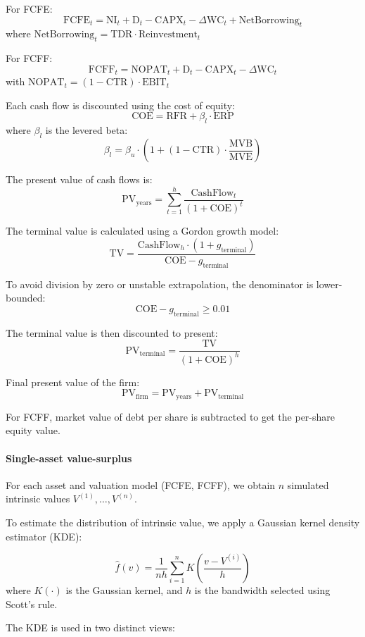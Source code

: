 For FCFE:
\[
\text{FCFE}_t = \text{NI}_t + \text{D}_t - \text{CAPX}_t - \Delta \text{WC}_t + \text{NetBorrowing}_t
\]
where $\text{NetBorrowing}_t = \text{TDR} \cdot \text{Reinvestment}_t$

For FCFF:
\[
\text{FCFF}_t = \text{NOPAT}_t + \text{D}_t - \text{CAPX}_t - \Delta \text{WC}_t
\]
with $\text{NOPAT}_t = (1 - \text{CTR}) \cdot \text{EBIT}_t$

Each cash flow is discounted using the cost of equity:
\[
\text{COE} = \text{RFR} + \beta_l \cdot \text{ERP}
\]
where $\beta_l$ is the levered beta:
\[
\beta_l = \beta_u \cdot \left(1 + (1 - \text{CTR}) \cdot \frac{\text{MVB}}{\text{MVE}} \right)
\]

The present value of cash flows is:
\[
\text{PV}_{\text{years}} = \sum_{t=1}^h \frac{\text{CashFlow}_t}{(1 + \text{COE})^t}
\]

The terminal value is calculated using a Gordon growth model:
\[
\text{TV} = \frac{\text{CashFlow}_h \cdot (1 + g_{\text{terminal}})}{\text{COE} - g_{\text{terminal}}}
\]

To avoid division by zero or unstable extrapolation, the denominator is lower-bounded:
\[
\text{COE} - g_{\text{terminal}} \geq 0.01
\]

The terminal value is then discounted to present:
\[
\text{PV}_{\text{terminal}} = \frac{\text{TV}}{(1 + \text{COE})^h}
\]

Final present value of the firm:
\[
\text{PV}_{\text{firm}} = \text{PV}_{\text{years}} + \text{PV}_{\text{terminal}}
\]

For FCFF, market value of debt per share is subtracted to get the per-share equity value.

\paragraph{Single-asset value-surplus}

For each asset and valuation model (FCFE, FCFF), we obtain $n$ simulated intrinsic values $V^{(1)}, \ldots, V^{(n)}$.

To estimate the distribution of intrinsic value, we apply a Gaussian kernel density estimator (KDE):

\[
\hat{f}(v) = \frac{1}{n h} \sum_{i=1}^n K\left(\frac{v - V^{(i)}}{h}\right)
\]
where $K(\cdot)$ is the Gaussian kernel, and $h$ is the bandwidth selected using Scott's rule.

The KDE is used in two distinct views:

